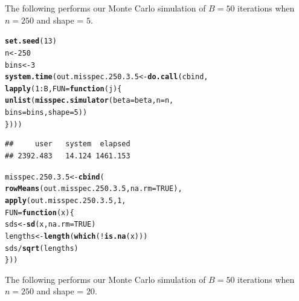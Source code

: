 \documentclass[11pt]{article}\usepackage[]{graphicx}\usepackage[]{color}
\makeatletter
\newcommand{\hlnum}[1]{\textcolor[rgb]{0.686,0.059,0.569}{#1}}%
\newcommand{\hlopt}[1]{\textcolor[rgb]{0,0,0}{#1}}%
\newcommand{\hlstd}[1]{\textcolor[rgb]{0.345,0.345,0.345}{#1}}%
\newcommand{\hlkwa}[1]{\textcolor[rgb]{0.161,0.373,0.58}{\textbf{#1}}}%
\newcommand{\hlkwb}[1]{\textcolor[rgb]{0.69,0.353,0.396}{#1}}%
\newcommand{\hlkwc}[1]{\textcolor[rgb]{0.333,0.667,0.333}{#1}}%
\newcommand{\hlkwd}[1]{\textcolor[rgb]{0.737,0.353,0.396}{\textbf{#1}}}%
\newenvironment{kframe}{%
 \def\at@end@of@kframe{}%
 \ifinner\ifhmode%
  \def\at@end@of@kframe{\end{minipage}}%
  \begin{minipage}{\columnwidth}%
 \fi\fi%
 \def\FrameCommand##1{\hskip\@totalleftmargin \hskip-\fboxsep
 \colorbox{shadecolor}{##1}\hskip-\fboxsep
     \hskip-\linewidth \hskip-\@totalleftmargin \hskip\columnwidth}%
 \MakeFramed {\advance\hsize-\width
   \@totalleftmargin\z@ \linewidth\hsize
   \@setminipage}}%
 {\par\unskip\endMakeFramed%
 \at@end@of@kframe}
\newenvironment{knitrout}{}{} %
\makeatother
\begin{document}
The following performs our Monte Carlo simulation of $B = 50$ iterations 
when $n = 250$ and shape = $5$. 

\begin{knitrout}
\color{fgcolor}\begin{kframe}
\begin{alltt}
\hlkwd{set.seed}\hlstd{(}\hlnum{13}\hlstd{)}
\hlstd{n} \hlkwb{<-} \hlnum{250}
\hlstd{bins} \hlkwb{<-} \hlnum{3}
\hlkwd{system.time}\hlstd{(out.misspec.250.3.5} \hlkwb{<-} \hlkwd{do.call}\hlstd{(cbind,}
  \hlkwd{lapply}\hlstd{(}\hlnum{1}\hlopt{:}\hlstd{B,} \hlkwc{FUN} \hlstd{=} \hlkwa{function}\hlstd{(}\hlkwc{j}\hlstd{)\{}
    \hlkwd{unlist}\hlstd{(}\hlkwd{misspec.simulator}\hlstd{(}\hlkwc{beta} \hlstd{= beta,} \hlkwc{n} \hlstd{= n,}
      \hlkwc{bins} \hlstd{= bins,} \hlkwc{shape} \hlstd{=} \hlnum{5}\hlstd{))}
\hlstd{\})))}
\end{alltt}
\begin{verbatim}
##     user   system  elapsed 
## 2392.483   14.124 1461.153
\end{verbatim}
\end{kframe}
\end{knitrout}

\begin{knitrout}
\color{fgcolor}\begin{kframe}
\begin{alltt}
\hlstd{misspec.250.3.5} \hlkwb{<-} \hlkwd{cbind}\hlstd{(}
  \hlkwd{rowMeans}\hlstd{(out.misspec.250.3.5,} \hlkwc{na.rm} \hlstd{=} \hlnum{TRUE}\hlstd{),}
  \hlkwd{apply}\hlstd{(out.misspec.250.3.5,} \hlnum{1}\hlstd{,}
  \hlkwc{FUN} \hlstd{=} \hlkwa{function}\hlstd{(}\hlkwc{x}\hlstd{)\{}
    \hlstd{sds} \hlkwb{<-} \hlkwd{sd}\hlstd{(x,} \hlkwc{na.rm} \hlstd{=} \hlnum{TRUE}\hlstd{)}
    \hlstd{lengths} \hlkwb{<-} \hlkwd{length}\hlstd{(}\hlkwd{which}\hlstd{(}\hlopt{!}\hlkwd{is.na}\hlstd{(x)))}
    \hlstd{sds} \hlopt{/} \hlkwd{sqrt}\hlstd{(lengths)}
  \hlstd{\}))}
\end{alltt}
\end{kframe}
\end{knitrout}

The following performs our Monte Carlo simulation of $B = 50$ iterations 
when $n = 250$ and shape = $20$.
\end{document}
